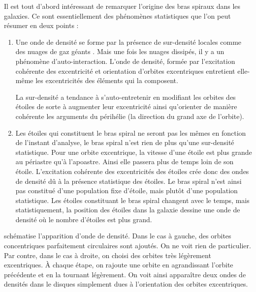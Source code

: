 \bigskip

Il est tout d'abord intéressant de remarquer l'origine des bras spiraux dans les galaxies. Ce sont essentiellement des phénomènes statistiques que l'on peut résumer en deux points : 
\begin{enumerate}
\item Une onde de densité se forme par la présence de sur-densité locales comme des nuages de gaz géants \citep{donghia2013self}. Mais une fois les nuages dissipés, il y a un phénomène d'auto-interaction. L'onde de densité, formée par l'excitation cohérente des excentricité et orientation d'orbites excentriques  entretient elle-même les excentricités des éléments qui la composent.

La sur-densité a tendance à s'auto-entretenir en modifiant les orbites des étoiles de sorte à augmenter leur excentricité ainsi qu'orienter de manière cohérente les arguments du périhélie (la direction du grand axe de l'orbite).
\item Les étoiles qui constituent le bras spiral ne seront pas les mêmes en fonction de l'instant d'analyse, le bras spiral n'est rien de plus qu'une sur-densité statistique. Pour une orbite excentrique, la vitesse d'une étoile est plus grande au périastre qu'à l'apoastre. Ainsi elle passera plus de temps loin de son étoile. L'excitation cohérente des excentricités des étoiles crée donc des ondes de densité dû à la présence statistique des étoiles. Le bras spiral n'est ainsi pas constitué d'une population fixe d'étoile, mais plutôt d'une population statistique. Les étoiles constituant le bras spiral changent avec le temps, mais statistiquement, la position des étoiles dans la galaxie dessine une onde de densité où le nombre d'étoiles est plus grand.
\end{enumerate}

 schématise l'apparition d'onde de densité. Dans le cas à gauche, des orbites concentriques parfaitement circulaires sont ajoutés. On ne voit rien de particulier. Par contre, dans le cas à droite, on choisi des orbites très légèrement excentriques. À chaque étape, on rajoute une orbite en agrandissant l'orbite précédente et en la tournant légèrement. On voit ainsi apparaître deux ondes de densités dans le disques simplement dues à l'orientation des orbites excentriques.

